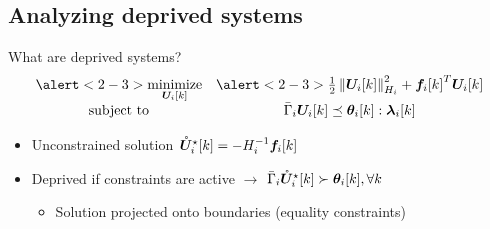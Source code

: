 \documentclass[aspectratio=169]{beamer}
\begin{document}
\subsection{Analyzing deprived systems}
\begin{frame}{What are deprived systems?}
  \centering
  \begin{equation*}
    \begin{matrix}
      \alert<2-3>{\minimize\limits_{\vec{U}_{i}[k]}}&\alert<2-3>{\frac{1}{2}\norm{\vec{U}_{i}[k]}^{2}_{H_{i}} + {\vec{f}_{i}[k]}^{T}\vec{U}_{i}[k]}\\
      \mathrm{subject~ to} & \bar{\Gamma}_{i}\vec{U}_{i}[k] \preceq \thetaik:\lambdaik
    \end{matrix}
  \end{equation*}
  \begin{itemize}
    \item<3-> Unconstrained solution $\mathring{\boldsymbol{U}}^{\star}_i[k]=-H_{i}^{-1}\boldsymbol{f}_{i}[k]$
    \item<4-> Deprived if constraints are active $\to$ $\bar{\Gamma}_{i}\optuncUik\succ \thetaik, \forall k$
          \begin{itemize}
            \item<5-> Solution projected onto boundaries (equality constraints)
          \end{itemize}
  \end{itemize}
  \begin{figure}[h]
    \centering
  \end{figure}
\end{frame}
\end{document}

